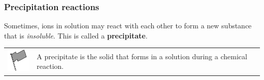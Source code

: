             \subsubsection{ Precipitation reactions}
            \nopagebreak
      \label{m38719*id339907}Sometimes, ions in solution may react with each other to form a new substance that is \textsl{insoluble}. This is called a \textbf{precipitate}.\par 
\label{m38719*fhsst!!!underscore!!!id887}\begin{definition}
	  \begin{tabular*}{15 cm}{m{15 mm}m{}}
	\hspace*{-50pt}  \includegraphics[width=0.5in]{col11305.imgs/psflag2.png}   & \Definition{   \label{id2493039}\textbf{ Precipitate }} { \label{m38719*meaningfhsst!!!underscore!!!id887}
      A precipitate is the solid that forms in a solution during a chemical reaction.
       } 
      \end{tabular*}
      \end{definition}
\label{m38719*secfhsst!!!underscore!!!id890}
